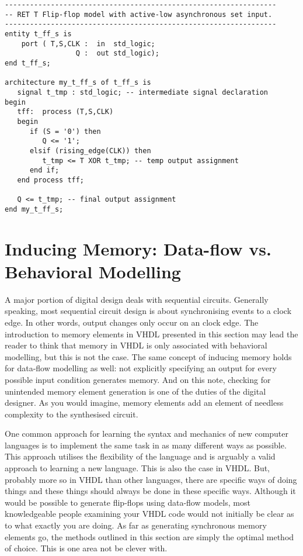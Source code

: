 \begin{lstlisting}[label=exe_17, caption=Solution to Example 17.]
-----------------------------------------------------------------
-- RET T Flip-flop model with active-low asynchronous set input.
-----------------------------------------------------------------
entity t_ff_s is 
    port ( T,S,CLK :  in  std_logic; 
                 Q :  out std_logic); 
end t_ff_s;

architecture my_t_ff_s of t_ff_s is 
   signal t_tmp : std_logic; -- intermediate signal declaration 
begin
   tff:  process (T,S,CLK)
   begin
      if (S = '0') then  
         Q <= '1'; 
      elsif (rising_edge(CLK)) then 
         t_tmp <= T XOR t_tmp; -- temp output assignment
      end if; 
   end process tff; 

   Q <= t_tmp; -- final output assignment
end my_t_ff_s; 
\end{lstlisting}    

\section{Inducing Memory: Data-flow vs. Behavioral Modelling}
A major portion of digital design deals with sequential circuits. Generally speaking, most sequential circuit design is about synchronising events to a clock edge. In other words, output changes only occur on an clock edge. The introduction to memory elements in VHDL presented in this section may lead the reader to think that memory in VHDL is only associated with behavioral modelling, but this is not the case. The same concept of inducing memory holds for data-flow modelling as well: not explicitly specifying an output for every possible input condition generates memory. And on this note, checking for unintended memory element generation is one of the duties of the digital designer. As you would imagine, memory elements add an element of needless complexity to the synthesised circuit.

One common approach for learning the syntax and mechanics of new computer languages is to implement the same task in as many different ways as possible. This approach utilises the flexibility of the language and is arguably a valid approach to learning a new language. This is also the case in VHDL. But, probably more so in VHDL than other languages, there are specific ways of doing things and these things should always be done in these specific ways. Although it would be possible to generate flip-flops using data-flow models, most knowledgeable people examining your VHDL code would not initially be clear as to what exactly you are doing. As far as generating synchronous memory elements go, the methods outlined in this section are simply the optimal method of choice. This is one area not be clever with. 

